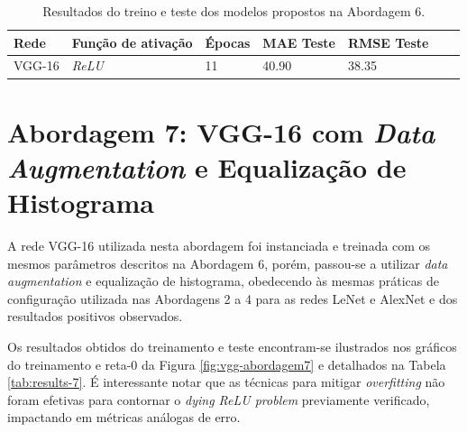 		\begin{table}[!ht]
			\centering
			\caption{Resultados do treino e teste dos modelos propostos na Abordagem 6.}
			\label{tab:results-6}
			\begin{tabular}{l l l l l l l}
				\toprule
				Rede & Função de ativação & Épocas & MAE Teste & RMSE Teste \\
				\midrule
				VGG-16 & \emph{ReLU} & 11 & 40.90 & 38.35 \\
				\bottomrule
			\end{tabular}
		\end{table}

\section{Abordagem 7: VGG-16 com \emph{Data Augmentation} e Equalização de Histograma}

	A rede VGG-16 utilizada nesta abordagem foi instanciada e treinada com os mesmos parâmetros descritos na Abordagem 6, porém, passou-se a utilizar \emph{data augmentation} e equalização de histograma, obedecendo às mesmas práticas de configuração utilizada nas Abordagens 2 a 4 para as redes LeNet e AlexNet e dos resultados positivos observados.

	Os resultados obtidos do treinamento e teste encontram-se ilustrados nos gráficos do treinamento e reta-0 da Figura \ref{fig:vgg-abordagem7} e detalhados na Tabela \ref{tab:results-7}. É interessante notar que as técnicas para mitigar \emph{overfitting} não foram efetivas para contornar o \emph{dying ReLU problem} previamente verificado, impactando em métricas análogas de erro.

